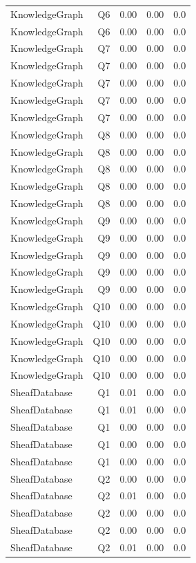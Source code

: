 \begin{table}[htbp]
\begin{tabular}{lrrrr}
KnowledgeGraph & Q6 & 0.00 & 0.00 & 0.0 \\
KnowledgeGraph & Q6 & 0.00 & 0.00 & 0.0 \\
KnowledgeGraph & Q7 & 0.00 & 0.00 & 0.0 \\
KnowledgeGraph & Q7 & 0.00 & 0.00 & 0.0 \\
KnowledgeGraph & Q7 & 0.00 & 0.00 & 0.0 \\
KnowledgeGraph & Q7 & 0.00 & 0.00 & 0.0 \\
KnowledgeGraph & Q7 & 0.00 & 0.00 & 0.0 \\
KnowledgeGraph & Q8 & 0.00 & 0.00 & 0.0 \\
KnowledgeGraph & Q8 & 0.00 & 0.00 & 0.0 \\
KnowledgeGraph & Q8 & 0.00 & 0.00 & 0.0 \\
KnowledgeGraph & Q8 & 0.00 & 0.00 & 0.0 \\
KnowledgeGraph & Q8 & 0.00 & 0.00 & 0.0 \\
KnowledgeGraph & Q9 & 0.00 & 0.00 & 0.0 \\
KnowledgeGraph & Q9 & 0.00 & 0.00 & 0.0 \\
KnowledgeGraph & Q9 & 0.00 & 0.00 & 0.0 \\
KnowledgeGraph & Q9 & 0.00 & 0.00 & 0.0 \\
KnowledgeGraph & Q9 & 0.00 & 0.00 & 0.0 \\
KnowledgeGraph & Q10 & 0.00 & 0.00 & 0.0 \\
KnowledgeGraph & Q10 & 0.00 & 0.00 & 0.0 \\
KnowledgeGraph & Q10 & 0.00 & 0.00 & 0.0 \\
KnowledgeGraph & Q10 & 0.00 & 0.00 & 0.0 \\
KnowledgeGraph & Q10 & 0.00 & 0.00 & 0.0 \\
SheafDatabase & Q1 & 0.01 & 0.00 & 0.0 \\
SheafDatabase & Q1 & 0.01 & 0.00 & 0.0 \\
SheafDatabase & Q1 & 0.00 & 0.00 & 0.0 \\
SheafDatabase & Q1 & 0.00 & 0.00 & 0.0 \\
SheafDatabase & Q1 & 0.00 & 0.00 & 0.0 \\
SheafDatabase & Q2 & 0.00 & 0.00 & 0.0 \\
SheafDatabase & Q2 & 0.01 & 0.00 & 0.0 \\
SheafDatabase & Q2 & 0.00 & 0.00 & 0.0 \\
SheafDatabase & Q2 & 0.00 & 0.00 & 0.0 \\
SheafDatabase & Q2 & 0.01 & 0.00 & 0.0 \\

\end{tabular}
\end{table}

